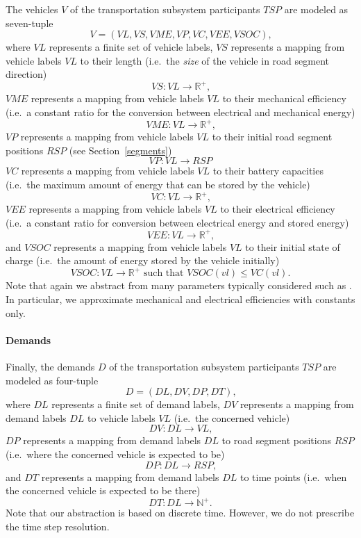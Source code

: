 The vehicles $V$ of the transportation subsystem participants $TSP$ are modeled as seven-tuple
\[
	V = (VL, VS, VME, VP, VC, VEE, VSOC) \textrm{,}
\]
where $VL$ represents a finite set of vehicle labels, $VS$ represents a mapping from vehicle labels $VL$ to their length (i.e.\ the \textit{size} of the vehicle in road segment direction)
\[
	VS : VL \rightarrow \mathbb{R}^+ \textrm{,}
\]
$VME$ represents a mapping from vehicle labels $VL$ to their mechanical efficiency (i.e.\ a constant ratio for the conversion between electrical and mechanical energy)
\[
	VME : VL \rightarrow \mathbb{R}^+ \textrm{,}
\]
$VP$ represents a mapping from vehicle labels $VL$ to their initial road segment positions $RSP$ (see Section~\ref{segments})
\[
	VP : VL \rightarrow RSP
\]
$VC$ represents a mapping from vehicle labels $VL$ to their battery capacities (i.e.\ the maximum amount of energy that can be stored by the vehicle)
\[
	VC : VL \rightarrow \mathbb{R}^+ \textrm{,}
\]
$VEE$ represents a mapping from vehicle labels $VL$ to their electrical efficiency (i.e.\ a constant ratio for conversion between electrical energy and stored energy)
\[
	VEE : VL \rightarrow \mathbb{R}^+ \textrm{,}
\]
and $VSOC$ represents a mapping from vehicle labels $VL$ to their initial state of charge (i.e.\ the amount of energy stored by the vehicle initially)
\[
	VSOC : VL \rightarrow \mathbb{R}^+ \textrm{ such that } VSOC(vl) \leq VC(vl) \textrm{.}
\]
Note that again we abstract from many parameters typically considered such as . In particular, we approximate mechanical and electrical efficiencies with constants only.

\paragraph{Demands}
\label{demands}

Finally, the demands $D$ of the transportation subsystem participants $TSP$ are modeled as four-tuple
\[
	D = (DL, DV, DP, DT) \textrm{,}
\]
where $DL$ represents a finite set of demand labels, $DV$ represents a mapping from demand labels $DL$ to vehicle labels $VL$ (i.e.\ the concerned vehicle)
\[
	DV: DL \rightarrow VL \textrm{,}
\]
$DP$ represents a mapping from demand labels $DL$ to road segment positions $RSP$ (i.e.\ where the concerned vehicle is expected to be)
\[
	DP: DL \rightarrow RSP \textrm{,}
\]
and $DT$ represents a mapping from demand labels $DL$ to time points (i.e.\ when the concerned vehicle is expected to be there)
\[
	DT: DL \rightarrow \mathbb{N}^+ \textrm{.}
\]
Note that our abstraction is based on discrete time. However, we do not prescribe the time step resolution.

